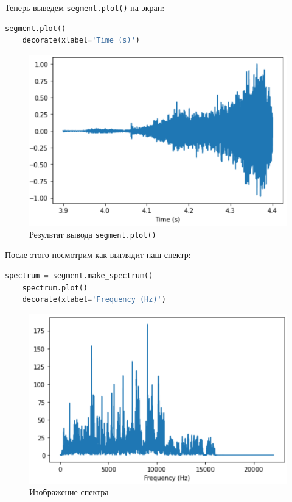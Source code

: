 \documentclass[a4paper]{article}
\begin{document}
            Теперь выведем \texttt{segment.plot()} на экран:
            
\begin{lstlisting}[language=Python, caption= Вывод \texttt{segment.plot()}]
    segment.plot()
    decorate(xlabel='Time (s)')
\end{lstlisting}
            
            \begin{figure}[H]
                \centering
                \includegraphics[width=\textwidth]{segment_plot.png}
                \caption{Результат вывода \texttt{segment.plot()}}
                \label{fig:result_output_2}
            \end{figure}
            
            После этого посмотрим как выглядит наш спектр:
            
\begin{lstlisting}[language=Python, caption= Изображение спектра]
    spectrum = segment.make_spectrum()
    spectrum.plot()
    decorate(xlabel='Frequency (Hz)')
\end{lstlisting}

            \begin{figure}[H]
                \centering
                \includegraphics[width=\textwidth]{spectr_ilustr.png}
                \caption{Изображение спектра}
                \label{fig:specrt_image}
            \end{figure}
            
\end{document}
